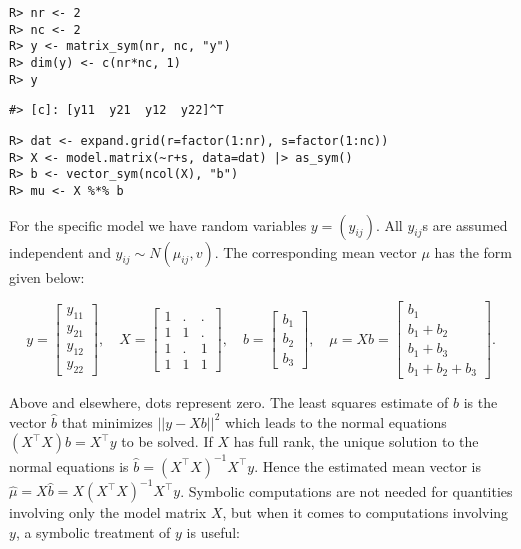 \begin{verbatim}
R> nr <- 2
R> nc <- 2
R> y <- matrix_sym(nr, nc, "y")
R> dim(y) <- c(nr*nc, 1)
R> y
\end{verbatim}

\begin{verbatim}
#> [c]: [y11  y21  y12  y22]^T
\end{verbatim}

\begin{verbatim}
R> dat <- expand.grid(r=factor(1:nr), s=factor(1:nc))
R> X <- model.matrix(~r+s, data=dat) |> as_sym()
R> b <- vector_sym(ncol(X), "b")
R> mu <- X %*% b
\end{verbatim}

For the specific model we have random variables \(y=(y_{ij})\). All \(y_{ij}\)s are assumed independent and \(y_{ij}\sim N(\mu_{ij}, v)\).
The corresponding mean vector \(\mu\) has the form given below:

\[
y = \left[\begin{matrix}y_{11}\\y_{21}\\y_{12}\\y_{22}\end{matrix}\right], \quad X=\left[\begin{matrix}1 & . & .\\1 & 1 & .\\1 & . & 1\\1 & 1 & 1\end{matrix}\right], \quad b=\left[\begin{matrix}b_{1}\\b_{2}\\b_{3}\end{matrix}\right], \quad  \mu = X b = \left[\begin{matrix}b_{1}\\b_{1} + b_{2}\\b_{1} + b_{3}\\b_{1} + b_{2} + b_{3}\end{matrix}\right] .
\]

Above and elsewhere, dots represent zero.
The least squares estimate of \(b\) is the vector \(\hat{b}\) that minimizes \(||y-X b||^2\) which leads to the normal equations \((X^\top X)b = X^\top y\) to be solved. If \(X\) has full rank, the unique solution to the normal
equations is \(\hat{b} = (X^\top X)^{-1} X^\top y\). Hence the
estimated mean vector is \(\hat \mu = X\hat{b}=X(X^\top X)^{-1} X^\top y\). Symbolic computations are
not needed for quantities involving only the model matrix \(X\), but
when it comes to computations involving \(y\), a symbolic treatment of
\(y\) is useful:

